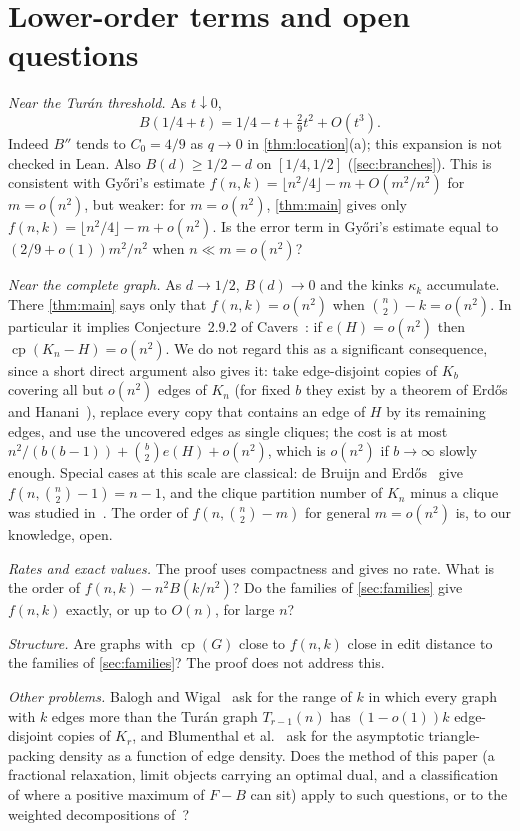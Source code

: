 \documentclass[10pt]{article}
\theoremstyle{definition}
\theoremstyle{remark}
\numberwithin{equation}{section}
\newcommand{\cp}{\operatorname{cp}}
\begin{document}
\section{Lower-order terms and open questions}\label{sec:discussion}

\emph{Near the Tur\'an threshold.} As $t\downarrow0$,
\[
 B(1/4+t)=1/4-t+\tfrac29t^2+O(t^3).
\]
Indeed $B''$ tends to $C_0=4/9$ as $q\to0$ in \cref{thm:location}(a); this expansion is not checked in Lean. Also $B(d)\ge1/2-d$ on $[1/4,1/2]$ (\cref{sec:branches}). This is consistent with Gy\H{o}ri's estimate $f(n,k)=\lfloor n^2/4\rfloor-m+O(m^2/n^2)$ for $m=o(n^2)$, but weaker: for $m=o(n^2)$, \cref{thm:main} gives only $f(n,k)=\lfloor n^2/4\rfloor-m+o(n^2)$. Is the error term in Gy\H{o}ri's estimate equal to $(2/9+o(1))m^2/n^2$ when $n\ll m=o(n^2)$?

\emph{Near the complete graph.} As $d\to1/2$, $B(d)\to0$ and the kinks $\kappa_k$ accumulate. There \cref{thm:main} says only that $f(n,k)=o(n^2)$ when $\binom n2-k=o(n^2)$. In particular it implies Conjecture~2.9.2 of Cavers~\cite{Cav05}: if $e(H)=o(n^2)$ then $\cp(K_n-H)=o(n^2)$. We do not regard this as a significant consequence, since a short direct argument also gives it: take edge-disjoint copies of $K_b$ covering all but $o(n^2)$ edges of $K_n$ (for fixed $b$ they exist by a theorem of Erd\H{o}s and Hanani~\cite{EH63}), replace every copy that contains an edge of $H$ by its remaining edges, and use the uncovered edges as single cliques; the cost is at most $n^2/(b(b-1))+\binom b2e(H)+o(n^2)$, which is $o(n^2)$ if $b\to\infty$ slowly enough. Special cases at this scale are classical: de Bruijn and Erd\H{o}s~\cite{dBE48} give $f(n,\binom n2-1)=n-1$, and the clique partition number of $K_n$ minus a clique was studied in~\cite{PD81,Wal82,EFO88}. The order of $f(n,\binom n2-m)$ for general $m=o(n^2)$ is, to our knowledge, open.

\emph{Rates and exact values.} The proof uses compactness and gives no rate. What is the order of $f(n,k)-n^2B(k/n^2)$? Do the families of \cref{sec:families} give $f(n,k)$ exactly, or up to $O(n)$, for large $n$?

\emph{Structure.} Are graphs with $\cp(G)$ close to $f(n,k)$ close in edit distance to the families of \cref{sec:families}? The proof does not address this.

\emph{Other problems.} Balogh and Wigal~\cite{BaWi25} ask for the range of $k$ in which every graph with $k$ edges more than the Tur\'an graph $T_{r-1}(n)$ has $(1-o(1))k$ edge-disjoint copies of $K_r$, and Blumenthal et al.~\cite{BLPPPV21} ask for the asymptotic triangle-packing density as a function of edge density. Does the method of this paper (a fractional relaxation, limit objects carrying an optimal dual, and a classification of where a positive maximum of $F-B$ can sit) apply to such questions, or to the weighted decompositions of~\cite{BHKNW26}?
\end{document}
